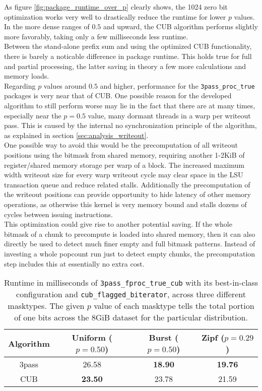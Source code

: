 \documentclass{tudscrreprt}
\begin{document}
			As figure \ref{fig:package_runtime_over_p} clearly shows, the 1024 zero bit optimization works very well to drastically reduce the runtime for lower $p$ values. In the more dense ranges of $0.5$ and upward, the CUB algorithm performs slightly more favorably, taking only a few milliseconds less runtime. \\
			
			Between the stand-alone prefix sum and using the optimized CUB functionality, there is barely a noticable difference in package runtime. This holds true for full and partial processing, the latter saving in theory a few more calculations and memory loads. \\
			
			Regarding $p$ values around $0.5$ and higher, performance for the \texttt{3pass\_proc\_true} packages is very near that of CUB. One possible reason for the developed algorithm to still perform worse may lie in the fact that there are at many times, especially near the $p=0.5$ value, many dormant threads in a warp per writeout pass. This is caused by the internal no synchronization principle of the algorithm, as explained in section \ref{sec:analysis_writeout}. \\
			One possible way to avoid this would be the precomputation of all writeout positions using the bitmask from shared memory, requiring another 1-2KiB of register/shared memory storage per warp of a block. The increased maximum width writeout size for every warp writeout cycle may clear space in the LSU transaction queue and reduce related stalls. Additionally the precomputation of the writeout positions can provide opportunity to hide latency of other memory operations, as otherwise this kernel is very memory bound and stalls dozens of cycles between issuing instructions. \\
			This optimization could give rise to another potential saving. If the whole bitmask of a chunk to precompute is loaded into shared memory, then it can also directly be used to detect much finer empty and full bitmask patterns. Instead of investing a whole popcount run just to detect empty chunks, the precomputation step includes this at essentially no extra cost. \\
			
			\begin{table}[!ht]
				\centering
				\begin{tabular}{c | c c c}
					\hline
					Algorithm & Uniform ($p=0.50$) & Burst ($p=0.50$) & Zipf ($p=0.29$) \\
					\hline
					3pass & 26.58 & \textbf{18.90} & \textbf{19.76} \\
					CUB & \textbf{23.50} & 23.78 & 21.59 \\
					\hline
				\end{tabular}
				\caption{\label{table:masktype_perf_comp}Runtime in milliseconds of \texttt{3pass\_fproc\_true\_cub} with its best-in-class configuration and \texttt{cub\_flagged\_biterator}, across three different masktypes. The given $p$ value of each masktype tells the total portion of one bits across the 8GiB dataset for the particular distribution.}
			\end{table}
			
\end{document}
